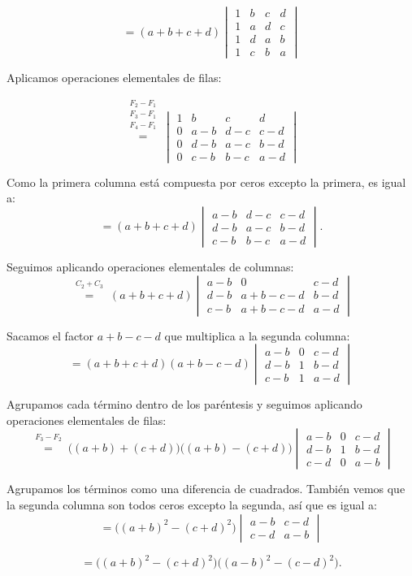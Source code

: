 \documentclass[a4paper,12pt]{article}
\begin{document}
\begin{ejercicio}[title=Ejercicio 36]
\[
= (a+b+c+d)
\begin{vmatrix}
1 & b & c & d\\
1 & a & d & c\\
1 & d & a & b\\
1 & c & b & a
\end{vmatrix}
\]

Aplicamos operaciones elementales de filas:

\[
\overset{\substack{F_2-F_1\\F_3-F_1\\F_4-F_1\\{}}}{=}
\begin{vmatrix}
1 & b & c & d\\
0 & a-b & d-c & c-d\\
0 & d-b & a-c & b-d\\
0 & c-b & b-c & a-d
\end{vmatrix}
\]

Como la primera columna está compuesta por ceros excepto la primera, es igual a:
\[
= (a+b+c+d)
\begin{vmatrix}
a-b & d-c & c-d\\
d-b & a-c & b-d\\
c-b & b-c & a-d
\end{vmatrix}.
\]

Seguimos aplicando operaciones elementales de columnas:
\[
\overset{\substack{C_2+C_3\\{}}}{=}
(a+b+c+d)
\begin{vmatrix}
a-b & 0 & c-d\\
d-b & a+b-c-d & b-d\\
c-b & a+b-c-d & a-d
\end{vmatrix}
\]

Sacamos el factor $a+b-c-d$ que multiplica a la segunda columna:
\[
= (a+b+c+d)(a+b-c-d)
\begin{vmatrix}
a-b & 0 & c-d\\
d-b & 1 & b-d\\
c-b & 1 & a-d
\end{vmatrix}
\]
\end{ejercicio}
\begin{ejercicio}[title=Ejercicio 36]
Agrupamos cada término dentro de los paréntesis y seguimos aplicando operaciones elementales de filas:
\[
\overset{\substack{F_3-F_2\\{}}}{=}
\big((a+b)+(c+d)\big)\big((a+b)-(c+d)\big)
\begin{vmatrix}
a-b & 0 & c-d\\
d-b & 1 & b-d\\
c-d & 0 & a-b
\end{vmatrix}
\]

Agrupamos los términos como una diferencia de cuadrados. También vemos que la segunda columna son todos ceros excepto la segunda, así que es igual a:
\[
= \big((a+b)^2-(c+d)^2\big)
\begin{vmatrix}
a-b & c-d\\
c-d & a-b
\end{vmatrix}
\]

\[
= \boxed{\big((a+b)^2-(c+d)^2\big)\big((a-b)^2-(c-d)^2\big)}.
\]

\end{ejercicio}
\end{document}
